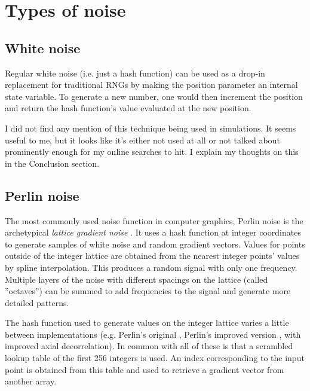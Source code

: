 \documentclass{article}
\begin{document}
\section*{Types of noise}

\subsection*{White noise}

Regular white noise (i.e. just a hash function) can be used as a drop-in
replacement for traditional RNGs by making the position parameter an internal
state variable. To generate a new number, one would then increment the
position and return the hash function's value evaluated at the new position.
\parencite{eiserloh_noise-based_2017}

I did not find any mention of this technique being used in simulations. It
seems useful to me, but it looks like it's either not used at all or not talked
about prominently enough for my online searches to hit. I explain my thoughts
on this in the Conclusion section.

\subsection*{Perlin noise}

The most commonly used noise function in computer graphics, Perlin noise
\parencite{perlin_image_1985,perlin_improving_2002} is the archetypical
\textit{lattice gradient noise} \parencite{lagae_survey_2010}. It uses a hash
function at integer coordinates to generate samples of white noise and random
gradient vectors. Values for points outside of the integer lattice are obtained
from the nearest integer points' values by spline interpolation. This produces
a random signal with only one frequency. Multiple layers of the noise with
different spacings on the lattice (called ''octaves'') can be summed to
add frequencies to the signal and generate more detailed patterns.

The hash function used to generate values on the integer lattice varies a
little between implementations (e.g. Perlin's original
\parencite*{perlin_image_1985}, Perlin's improved version
\parencite*{perlin_improving_2002}, \textcite{kensler_better_2008} with
improved axial decorrelation). In common with all of these is that a scrambled
lookup table of the first 256 integers is used. An index corresponding to the
input point is obtained from this table and used to retrieve a gradient vector
from another array.
\end{document}
